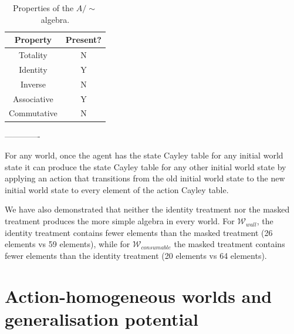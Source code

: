 \begin{table}[H]
    \centering
    \begin{tabular}{c|c}
        \textbf{Property}   & \textbf{Present?} \\
        \hline
        Totality            & N\\
        Identity            & Y\\
        Inverse             & N\\
        Associative         & Y\\
        Commutative         & N
    \end{tabular}
    \caption{Properties of the $A/\sim$ algebra.}
    \label{tab:masked-consumable-properties}
\end{table}








-------------

\begin{remark}
    For any world, once the agent has the state Cayley table for any initial world state it can produce the state Cayley table for any other initial world state by applying an action that transitions from the old initial world state to the new initial world state to every element of the action Cayley table.
\end{remark}

We have also demonstrated that neither the identity treatment nor the masked treatment produces the more simple algebra in every world.
For $\mathscr{W}_{wall}$, the identity treatment contains fewer elements than the masked treatment (26 elements vs 59 elements), while for $\mathscr{W}_{consumable}$ the masked treatment contains fewer elements than the identity treatment (20 elements vs 64 elements).



\chapter{Action-homogeneous worlds and generalisation potential}



